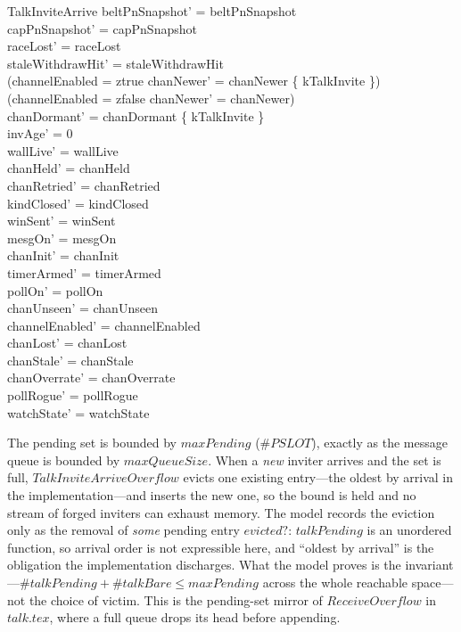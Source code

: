 \documentclass[a4paper,10pt,fleqn]{article}
\begin{document}
\begin{schema}{TalkInviteArrive}
  beltPnSnapshot' = beltPnSnapshot \\
  capPnSnapshot' = capPnSnapshot \\
  raceLost' = raceLost \\
  staleWithdrawHit' = staleWithdrawHit \\
  (channelEnabled = ztrue \implies
  chanNewer' = chanNewer \cup \{ kTalkInvite \}) \\
  (channelEnabled = zfalse \implies chanNewer' = chanNewer) \\
  chanDormant' = chanDormant \setminus \{ kTalkInvite \} \\
  invAge' = 0 \\
  wallLive' = wallLive \\
  chanHeld' = chanHeld \\
  chanRetried' = chanRetried \\
  kindClosed' = kindClosed \\
  winSent' = winSent \\
  mesgOn' = mesgOn \\
  chanInit' = chanInit \\
  timerArmed' = timerArmed \\
  pollOn' = pollOn \\
  chanUnseen' = chanUnseen \\
  channelEnabled' = channelEnabled \\
  chanLost' = chanLost \\
  chanStale' = chanStale \\
  chanOverrate' = chanOverrate \\
  pollRogue' = pollRogue \\
  watchState' = watchState
\end{schema}

The pending set is bounded by $maxPending$ ($\# PSLOT$), exactly as the
message queue is bounded by $maxQueueSize$.  When a \emph{new} inviter
arrives and the set is full, $TalkInviteArriveOverflow$ evicts one
existing entry---the oldest by arrival in the implementation---and
inserts the new one, so the bound is held and no stream of forged
inviters can exhaust memory.  The model records the eviction only as
the removal of \emph{some} pending entry $evicted?$: $talkPending$ is an
unordered function, so arrival order is not expressible here, and
``oldest by arrival'' is the obligation the implementation discharges.
What the model proves is the invariant---$\# talkPending + \# talkBare
\leq maxPending$ across the whole reachable space---not the choice of
victim.  This is the pending-set mirror of $ReceiveOverflow$ in
$talk.tex$, where a full queue drops its head before appending.
\end{document}
